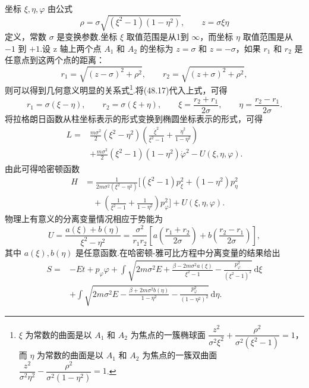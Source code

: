 坐标 $\xi,\eta,\varphi$ 由公式
\begin{equation}
  \rho=\sigma\sqrt{(\xi^2-1)(1-\eta^2)},\qquad z=\sigma\xi\eta
\end{equation}
定义，常数 $\sigma$ 是变换参数.坐标 $\xi$
取值范围是从1到 $\infty$，而坐标 $\eta$
取值范围是从 $-1$ 到 $+1$.设 z 轴上两个点 $A_1$ 和 $A_2$
的坐标为 $z=\sigma$ 和 $z=-\sigma$，如果 $r_1$ 和 $r_2$
是任意点到这两个点的距离：
\begin{equation*}
  r_1=\sqrt{(z-\sigma)^2+\rho^2},\qquad
  r_2=\sqrt{(z+\sigma)^2+\rho^2},
\end{equation*}
则可以得到几何意义明显的关系式\footnote{$\xi$ 为常数的曲面是以 $A_1$ 和 $A_2$ 为焦点的一簇椭球面 $\dfrac{z^2}{\sigma^2\xi^2}+\dfrac{\rho^2}{\sigma^2(\xi^2-1)}=1$，而 $\eta$ 为常数的曲面是以 $A_1$ 和 $A_2$ 为焦点的一簇双曲面 $\dfrac{z^2}{\sigma^2\eta^2}-\dfrac{\rho^2}{\sigma^2(1-\eta^2)}=1$.}.将(48.17)代入上式，可得
\begin{equation}
  r_1=\sigma(\xi-\eta),\qquad r_2=\sigma(\xi+\eta),\qquad
  \xi=\frac{r_2+r_1}{2\sigma},\qquad \eta=\frac{r_2-r_1}{2\sigma}.
\end{equation}
将拉格朗日函数从柱坐标表示的形式变换到椭圆坐标表示的形式，可得
\begin{equation}
\begin{aligned}
  L={}&\frac{m\sigma^2}{2}\left(\xi^2-\eta^2\right)
  \left(\frac{\dot{\xi}^2}{\xi^2-1}+\frac{\dot{\eta}^2}{1-\eta^2}\right)\\
  &+\frac{m\sigma^2}{2}\left(\xi^2-1\right)\left(1-\eta^2\right)\dot{\varphi}^2
  -U(\xi,\eta,\varphi).
\end{aligned}
\end{equation}
由此可得哈密顿函数
\begin{equation}
\begin{aligned}
  H&=\frac{1}{2m\sigma^2(\xi^2-\eta^2)}
  \bigl[\left(\xi^2-1\right)p_\xi^2
  +\left(1-\eta^2\right)p_\eta^2\\
  &\quad+\left(\frac{1}{\xi^2-1}+\frac{1}{1-\eta^2}\right)p_\varphi^2\bigr]
  +U(\xi,\eta,\varphi).
\end{aligned}
\end{equation}
物理上有意义的分离变量情况相应于势能为
\begin{equation}
  U=\frac{a(\xi)+b(\eta)}{\xi^2-\eta^2}
  =\frac{\sigma^2}{r_1r_2}\left[a\left(\frac{r_1+r_2}{2\sigma}\right)
  +b\left(\frac{r_2-r_1}{2\sigma}\right)\right],
\end{equation}
其中 $a(\xi),b(\eta)$
是任意函数.在哈密顿-雅可比方程中分离变量的结果给出
\begin{equation}
\begin{aligned}
  S={}&-Et+p_\varphi\varphi
  +\int\sqrt{2m\sigma^2E+\frac{\beta-2m\sigma^2a(\xi)}{\xi^2-1}
  -\frac{p_\varphi^2}{(\xi^2-1)^2}}\,\mathrm{d}\xi\\
  &+\int\sqrt{2m\sigma^2E-\frac{\beta+2m\sigma^2b(\eta)}{1-\eta^2}
  -\frac{p_\varphi^2}{(1-\eta^2)^2}}\,\mathrm{d}\eta.
\end{aligned}
\end{equation}

